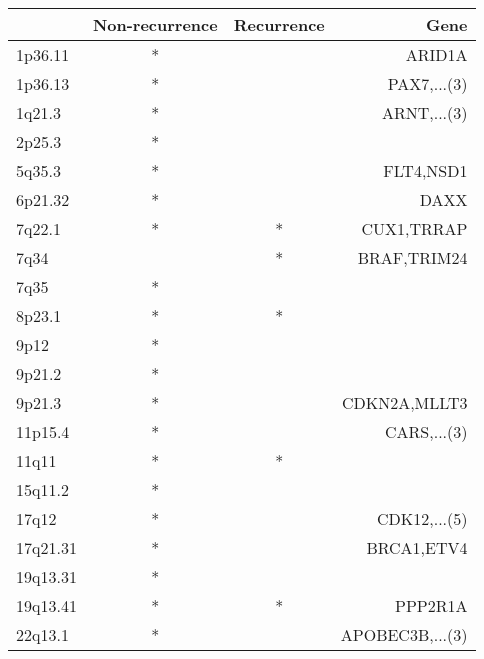 \begin{tabular}{lccr}
\toprule
{} & Non-recurrence & Recurrence &             Gene \\
\midrule
1p36.11  &              * &            &           ARID1A \\
1p36.13  &              * &            &      PAX7,...(3) \\
1q21.3   &              * &            &      ARNT,...(3) \\
2p25.3   &              * &            &                  \\
5q35.3   &              * &            &        FLT4,NSD1 \\
6p21.32  &              * &            &             DAXX \\
7q22.1   &              * &          * &       CUX1,TRRAP \\
7q34     &                &          * &      BRAF,TRIM24 \\
7q35     &              * &            &                  \\
8p23.1   &              * &          * &                  \\
9p12     &              * &            &                  \\
9p21.2   &              * &            &                  \\
9p21.3   &              * &            &     CDKN2A,MLLT3 \\
11p15.4  &              * &            &      CARS,...(3) \\
11q11    &              * &          * &                  \\
15q11.2  &              * &            &                  \\
17q12    &              * &            &     CDK12,...(5) \\
17q21.31 &              * &            &       BRCA1,ETV4 \\
19q13.31 &              * &            &                  \\
19q13.41 &              * &          * &          PPP2R1A \\
22q13.1  &              * &            &  APOBEC3B,...(3) \\
\bottomrule
\end{tabular}

